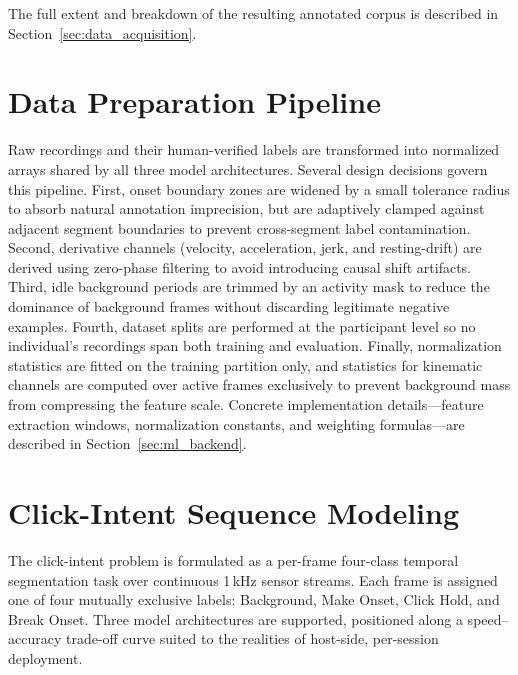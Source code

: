 The full extent and breakdown of the resulting annotated corpus is described in Section~\ref{sec:data_acquisition}.

\section{Data Preparation Pipeline}

Raw recordings and their human-verified labels are transformed into normalized arrays shared by all three model architectures. Several design decisions govern this pipeline. First, onset boundary zones are widened by a small tolerance radius to absorb natural annotation imprecision, but are adaptively clamped against adjacent segment boundaries to prevent cross-segment label contamination. Second, derivative channels (velocity, acceleration, jerk, and resting-drift) are derived using zero-phase filtering to avoid introducing causal shift artifacts. Third, idle background periods are trimmed by an activity mask to reduce the dominance of background frames without discarding legitimate negative examples. Fourth, dataset splits are performed at the participant level so no individual's recordings span both training and evaluation. Finally, normalization statistics are fitted on the training partition only, and statistics for kinematic channels are computed over active frames exclusively to prevent background mass from compressing the feature scale. Concrete implementation details---feature extraction windows, normalization constants, and weighting formulas---are described in Section~\ref{sec:ml_backend}.

\section{Click-Intent Sequence Modeling}
\label{sec:modeling}

The click-intent problem is formulated as a per-frame four-class temporal segmentation task over continuous 1\,kHz sensor streams. Each frame is assigned one of four mutually exclusive labels: Background, Make Onset, Click Hold, and Break Onset. Three model architectures are supported, positioned along a speed--accuracy trade-off curve suited to the realities of host-side, per-session deployment.

